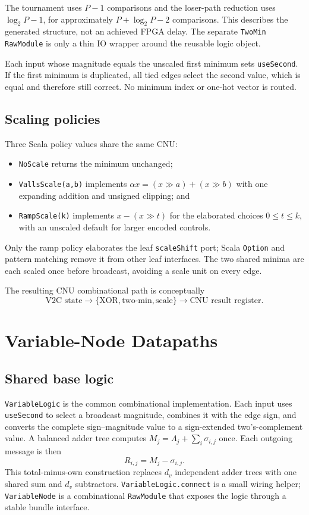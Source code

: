 \documentclass[10pt,conference]{IEEEtran}
\begin{document}
The tournament uses $P-1$ comparisons and the loser-path reduction uses
$\log_2P-1$, for approximately $P+\log_2P-2$ comparisons.  This describes the
generated structure, not an achieved FPGA delay.  The separate \texttt{TwoMin}
\texttt{RawModule} is only a thin IO wrapper around the reusable logic object.

Each input whose magnitude equals the unscaled first minimum sets
\texttt{useSecond}.  If the first minimum is duplicated, all tied edges select
the second value, which is equal and therefore still correct.  No minimum index
or one-hot vector is routed.

\subsection{Scaling policies}
Three Scala policy values share the same CNU:
\begin{itemize}
  \item \texttt{NoScale} returns the minimum unchanged;
  \item \texttt{VallsScale(a,b)} implements
        $\alpha x=(x\gg a)+(x\gg b)$ with one expanding addition and unsigned
        clipping; and
  \item \texttt{RampScale(k)} implements $x-(x\gg t)$ for the elaborated
        choices $0\leq t\leq k$, with an unscaled default for larger encoded
        controls.
\end{itemize}
Only the ramp policy elaborates the leaf \texttt{scaleShift} port; Scala
\texttt{Option} and pattern matching remove it from other leaf interfaces.
The two shared minima are each scaled once before broadcast, avoiding a scale
unit on every edge.

The resulting CNU combinational path is conceptually
\begin{equation}
 \text{V2C state}\rightarrow
 \{\text{XOR},\text{two-min},\text{scale}\}\rightarrow
 \text{CNU result register}.
\end{equation}

\section{Variable-Node Datapaths}
\subsection{Shared base logic}
\texttt{VariableLogic} is the common combinational implementation.  Each input
uses \texttt{useSecond} to select a broadcast magnitude, combines it with the
edge sign, and converts the complete sign--magnitude value to a sign-extended
two's-complement value.  A balanced adder tree computes
$M_j=\Lambda_j+\sum_i\sigma_{i,j}$ once.  Each outgoing message is then
\begin{equation}
 R_{i,j}=M_j-\sigma_{i,j}.
\end{equation}
This total-minus-own construction replaces $d_v$ independent adder trees with
one shared sum and $d_v$ subtractors.  \texttt{VariableLogic.connect} is a
small wiring helper; \texttt{VariableNode} is a combinational \texttt{RawModule}
that exposes the logic through a stable bundle interface.
\end{document}
